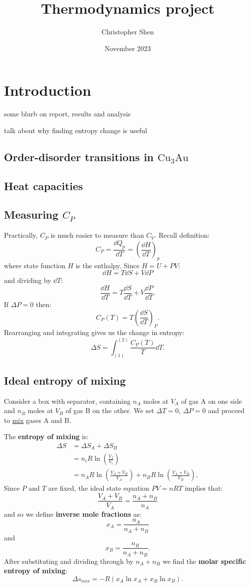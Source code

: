 \documentclass{article}
\title{Thermodynamics project}
\author{Christopher Shen}
\date{November 2023}
\begin{document}
\maketitle

\tableofcontents
\newpage

\section{Introduction}
some blurb on report, results and analysis

talk about why finding entropy change is useful

\subsection{Order-disorder transitions in $\text{Cu}_3\text{Au}$}

\subsection{Heat capacities}

\subsection{Measuring $C_P$}
Practically, $C_P$ is much easier to measure than $C_V$. Recall definition:
$$C_P=\frac{\dd Q_p}{\dd T}=\left(\frac{\dd H}{\dd T}\right)_p$$
where state function $H$ is the enthalpy. Since $H=U+PV$:
$$\dd H=T\dd S+V\dd P$$
and dividing by $\dd T$:
$$\frac{\dd H}{\dd T}=T\frac{\dd S}{\dd T}+V\frac{\dd P}{\dd T}.$$
If $\Delta P=0$ then:
$$C_P(T)=T\left(\frac{\dd S}{\dd T}\right)_P.$$
Rearranging and integrating gives us the change in entropy:
$$\Delta S=\int_{(1)}^{(2)}\frac{C_P(T)}{T}\dd T.$$

\subsection{Ideal entropy of mixing}
Consider a box with separator, containing $n_A$ moles at $V_A$ of gas A on one side and $n_B$ moles at $V_B$ of gas B on the other. We set $\Delta T=0$, $\Delta P=0$ and proceed to \underline{mix} gases A and B.

The \textbf{entropy of mixing} is:
\begin{align*}
    \Delta S
    &=\Delta S_A+\Delta S_B \\
    &=n_i R\ln\left(\frac{V_f}{V_i}\right) \\
    &=n_A R\ln\left(\frac{V_A+V_B}{V_A}\right)
    +n_B R\ln\left(\frac{V_A+V_B}{V_B}\right),
\end{align*}
Since $P$ and $T$ are fixed, the ideal state equation $PV=nRT$ implies that:
$$\frac{V_A+V_B}{V_A}=\frac{n_A+n_B}{n_A}$$
and so we define \textbf{inverse mole fractions} as:
$$x_A=\frac{n_A}{n_A+n_B}$$
and
$$x_B=\frac{n_B}{n_A+n_B}.$$
After substituting and dividing through by $n_A+n_B$ we find the \textbf{molar specific entropy of mixing}:
$$\Delta s_{mix}=-R(x_A\ln x_A+x_B\ln x_B).$$
\end{document}
